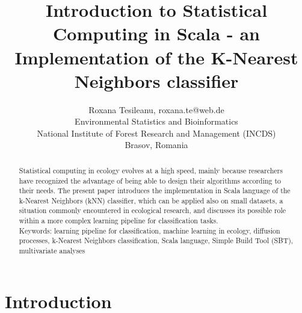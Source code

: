 \documentclass[twoside, 11p]{article}
\begin{document}
\title{Introduction to Statistical Computing in Scala - an Implementation of the K-Nearest Neighbors classifier}

\author{Roxana Tesileanu, roxana.te@web.de \\
	Environmental Statistics and Bioinformatics \\
	National Institute of Forest Research and Management (INCDS)\\
	Brasov, Romania} 


\maketitle

\begin{abstract}%
 Statistical computing in ecology evolves at a high speed, mainly because researchers have recognized the advantage of being able to design their algorithms according to their needs.
 The present paper introduces the implementation in Scala language of the k-Nearest Neighbors (kNN) classifier, which can be applied also on small datasets, a situation commonly encountered in ecological research, and discusses its possible role within a more complex learning pipeline for classification tasks.\\


Keywords: learning pipeline for classification, machine learning in ecology, diffusion processes,  k-Nearest Neighbors classification, Scala language, Simple Build Tool (SBT), multivariate analyses 
 

\end{abstract}


\section{Introduction}
   
\end{document}
